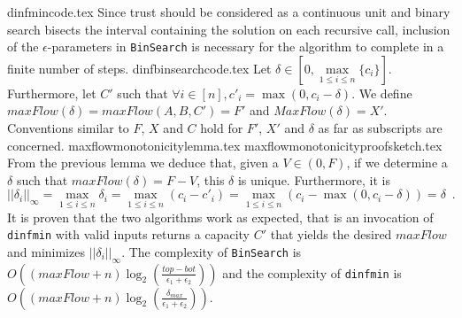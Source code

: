   {dinfmincode.tex}
  Since trust should be considered as a continuous unit and binary search bisects the interval containing the solution
  on each recursive call, inclusion of the $\epsilon$-parameters in \texttt{BinSearch} is necessary for the algorithm to
  complete in a finite number of steps.
  {dinfbinsearchcode.tex}
  Let $\delta \in \left[0, \max\limits_{1 \leq i \leq n}{\{c_i\}}\right]$. Furthermore, let $C'$ such that
  $\forall i \in \left[n\right], c'_i = \max{\left(0, c_i - \delta\right)}$. We define $maxFlow\left(\delta\right) = 
  maxFlow\left(A, B, C'\right) = F'$ and $MaxFlow\left(\delta\right) = X'$. Conventions similar to $F$, $X$ and $C$ hold
  for $F'$, $X'$ and $\delta$ as far as subscripts are concerned.
  {maxflowmonotonicitylemma.tex}
  {maxflowmonotonicityproofsketch.tex}
  From the previous lemma we deduce that, given a $V \in \left(0, F\right)$, if we determine a $\delta$ such that
  $maxFlow\left(\delta\right) = F - V$, this $\delta$ is unique. Furthermore, it is
  \begin{equation*}
    ||\delta_i||_\infty = \max\limits_{1 \leq i \leq n}{\delta_i} = \max\limits_{1 \leq i \leq n}{\left(c_i - c'_i\right)} =
    \max\limits_{1 \leq i \leq n}{\left(c_i - \max{\left(0, c_i - \delta\right)}\right)} = \delta \enspace.
  \end{equation*}
  It is proven that the two algorithms work as expected, that is an invocation of \texttt{dinfmin} with valid inputs returns
  a capacity $C'$ that yields the desired $maxFlow$ and minimizes $||\delta_i||_\infty$. The complexity of \texttt{BinSearch}
  is $O\left(\left(maxFlow + n\right)\log_2\left(\frac{top - bot}{\epsilon_1 + \epsilon_2}\right)\right)$ and the complexity
  of \texttt{dinfmin} is
  $O\left(\left(maxFlow + n\right)\log_2\left(\frac{\delta_{max}}{\epsilon_1 + \epsilon_2}\right)\right)$.

